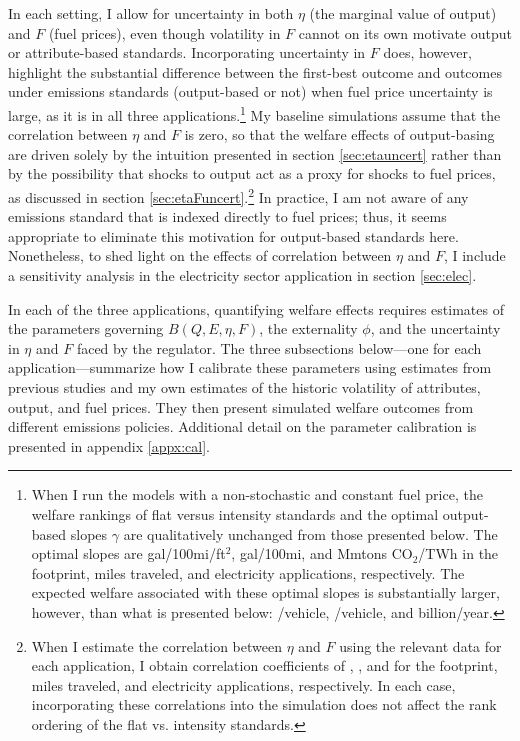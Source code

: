 \documentclass[12pt]{article}
\begin{document}
In each setting, I allow for uncertainty in both $\eta$ (the marginal value of output) and $F$ (fuel prices), even though volatility in $F$ cannot on its own motivate output or attribute-based standards. Incorporating uncertainty in $F$  does, however, highlight the substantial difference between the first-best outcome and outcomes under emissions standards (output-based or not) when fuel price uncertainty is large, as it is in all three applications.\footnote{When I run the models with a non-stochastic and constant fuel price, the welfare rankings of flat versus intensity standards and the optimal output-based slopes $\gamma$ are qualitatively unchanged from those presented below. The optimal slopes are gal/100mi/ft$^2$, gal/100mi, and Mmtons CO$_2$/TWh in the footprint, miles traveled, and electricity applications, respectively. The expected welfare associated with these optimal slopes is substantially larger, however, than what is presented below: \unskip/vehicle, \unskip/vehicle, and billion/year.} My baseline simulations assume that the correlation between $\eta$ and $F$ is zero, so that the welfare effects of output-basing are driven solely by the intuition presented in section \ref{sec:etauncert} rather than by the possibility that shocks to output act as a proxy for shocks to fuel prices, as discussed in section \ref{sec:etaFuncert}.\footnote{When I estimate the correlation between $\eta$ and $F$ using the relevant data for each application, I obtain correlation coefficients of \unskip, \unskip, and for the footprint, miles traveled, and electricity applications, respectively. In each case, incorporating these correlations into the simulation does not affect the rank ordering of the flat vs. intensity standards.} In practice, I am not aware of any emissions standard that is indexed directly to fuel prices; thus, it seems appropriate to eliminate this motivation for output-based standards here. Nonetheless, to shed light on the effects of correlation between $\eta$ and $F$, I include a sensitivity analysis in the electricity sector application in section \ref{sec:elec}.

In each of the three applications, quantifying welfare effects requires estimates of the parameters governing $B(Q,E,\eta,F)$, the externality $\phi$, and the uncertainty in $\eta$ and $F$ faced by the regulator. The three subsections below---one for each application---summarize how I calibrate these parameters using estimates from previous studies and my own estimates of the historic volatility of attributes, output, and fuel prices. They then present simulated welfare outcomes from different emissions policies. Additional detail on the parameter calibration is presented in appendix \ref{appx:cal}.
\end{document}

